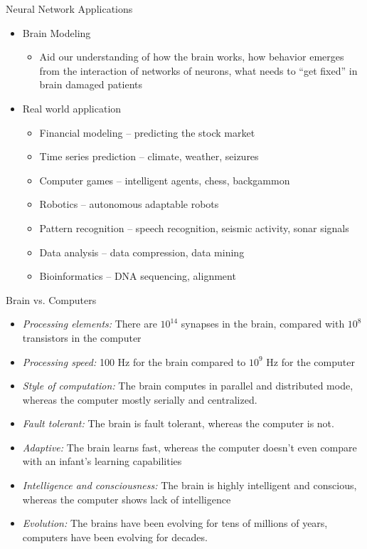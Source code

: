 \begin{frame}{Neural Network Applications}
\begin{itemize}
\item Brain Modeling
\begin{itemize}
\item Aid our understanding of how the brain works, how behavior emerges from the interaction of networks of neurons, what needs to “get fixed” in brain
damaged patients
\end{itemize}
\item Real world application
\begin{itemize}
\item Financial modeling -- predicting the stock market
\item Time series prediction -- climate, weather, seizures
\item Computer games -- intelligent agents, chess, backgammon
\item Robotics -- autonomous adaptable robots
\item Pattern recognition -- speech recognition, seismic activity, sonar signals
\item Data analysis -- data compression, data mining
\item Bioinformatics -- DNA sequencing, alignment
\end{itemize}
\end{itemize}
\end{frame}

\begin{frame}{Brain vs. Computers}
\begin{footnotesize}
\begin{itemize}
\item \textit{\color{slidecolor}Processing elements:} There are $10^{14}$ synapses in the brain, compared with $10^8$ transistors in the computer
\item \textit{\color{slidecolor}Processing speed:} 100 Hz for the brain compared to $10^9$ Hz for the computer
\item \textit{\color{slidecolor}Style of computation:} The brain computes in parallel and distributed mode, whereas the computer mostly serially and centralized.
\item \textit{\color{slidecolor}Fault tolerant:} The brain is fault tolerant, whereas the computer is not. 
\item \textit{\color{slidecolor}Adaptive:} The brain learns fast, whereas the computer doesn't even compare with an infant's learning capabilities
\item \textit{\color{slidecolor}Intelligence and consciousness:} The brain is highly intelligent and
conscious, whereas the computer shows lack of intelligence
\item \textit{\color{slidecolor}Evolution:} The brains have been evolving for tens of millions of years,
computers have been evolving for decades.
\end{itemize}
\end{footnotesize}
\end{frame}

